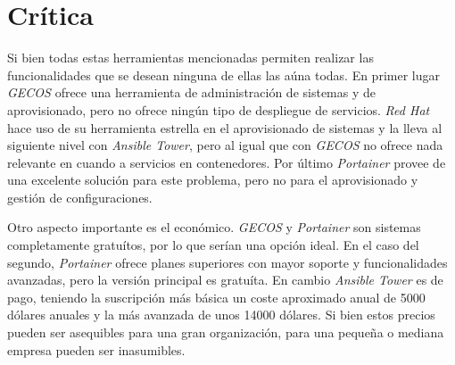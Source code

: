 \section{Crítica}

Si bien todas estas herramientas mencionadas permiten realizar las funcionalidades que se desean ninguna de ellas las aúna todas. En primer lugar \textit{GECOS} ofrece una herramienta de administración de sistemas y de aprovisionado, pero no ofrece ningún tipo de despliegue de servicios. \textit{Red Hat} hace uso de su herramienta estrella en el aprovisionado de sistemas y la lleva al siguiente nivel con \textit{Ansible Tower}, pero al igual que con \textit{GECOS} no ofrece nada relevante en cuando a servicios en contenedores. Por último \textit{Portainer} provee de una excelente solución para este problema, pero no para el aprovisionado y gestión de configuraciones.

Otro aspecto importante es el económico. \textit{GECOS} y \textit{Portainer} son sistemas completamente gratuítos, por lo que serían una opción ideal. En el caso del segundo, \textit{Portainer} ofrece planes superiores con mayor soporte y funcionalidades avanzadas, pero la versión principal es gratuíta. En cambio \textit{Ansible Tower} es de pago, teniendo la suscripción más básica un coste aproximado anual de 5000 dólares anuales y la más avanzada de unos 14000 dólares. Si bien estos precios pueden ser asequibles para una gran organización, para una pequeña o mediana empresa pueden ser inasumibles.